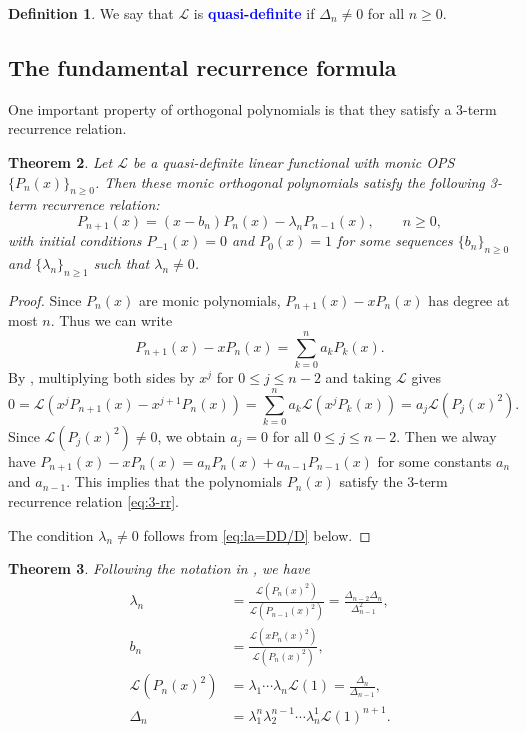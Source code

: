 \documentclass{amsart}
\numberwithin{equation}{section}
\newtheorem{thm}{Theorem}[section]
\theoremstyle{definition}
\newtheorem{defn}[thm]{Definition}
\newcommand\LL{\mathcal{L}}
\renewcommand\emph[1]{\textcolor{blue}{\bf #1}}
\begin{document}
\begin{defn}
  We say that \( \LL \) is \emph{quasi-definite} if
  \( \Delta_n\ne 0 \) for all \( n\ge0 \).
\end{defn}


\subsection{The fundamental recurrence formula}

One important property of orthogonal polynomials is that they satisfy
a 3-term recurrence relation.

\begin{thm}\label{thm:3-RR}
  Let \( \LL \) be a quasi-definite linear functional
  with monic OPS \( \{ P_n(x) \}_{n\ge 0} \).
  Then these monic orthogonal polynomials satisfy
  the following 3-term recurrence relation:
  \begin{equation}\label{eq:3-rr}
    P_{n+1}(x) = (x-b_n) P_n(x) - \lambda_n P_{n-1}(x), \qquad n\ge0,
  \end{equation}
  with initial conditions \( P_{-1}(x) = 0 \) and \( P_0(x) = 1 \) for
  some sequences \( \{b_n\}_{n\ge0} \) and \( \{\lambda_n\}_{n\ge1} \)
  such that \( \lambda_n\ne 0 \).
\end{thm}
\begin{proof}
  Since \( P_n(x) \) are monic polynomials, \( P_{n+1}(x) - xP_n(x) \)
  has degree at most \( n \). Thus we can write
  \[
    P_{n+1}(x) - xP_n(x) = \sum_{k=0}^n a_k P_k(x).
  \]
  By , multiplying both sides by \( x^j \) for \( 0\le j\le n-2 \)
  and taking \( \LL \) gives
  \[
 0 = \LL(x^j P_{n+1}(x) - x^{j+1}P_n(x))
    = \sum_{k=0}^n a_k \LL(x^j P_k(x))  = a_j \LL(P_j(x)^2).
  \]
  Since \( \LL(P_j(x)^2) \ne 0 \), we obtain \( a_j=0 \) for all
  \( 0\le j\le n-2 \). Then we alway have
  \( P_{n+1}(x) - xP_n(x) = a_nP_n(x) + a_{n-1}P_{n-1}(x) \) for some
  constants \( a_n \) and \( a_{n-1} \). This implies that the
  polynomials \( P_n(x) \) satisfy the 3-term recurrence relation
  \eqref{eq:3-rr}.

  The condition \( \lambda_n\ne 0 \) follows from \eqref{eq:la=DD/D} below.
\end{proof}

\begin{thm}
  Following the notation in , we have
  \begin{align}
    \label{eq:la=DD/D}
    \lambda_n &= \frac{\LL(P_n(x)^2)}{\LL(P_{n-1}(x)^2)} = \frac{\Delta_{n-2}\Delta_n}{\Delta_{n-1}^2}, \\
    \label{eq:b=xP/P}
    b_n &= \frac{\LL(xP_{n}(x)^2)}{\LL(P_{n}(x)^2)},\\
    \label{eq:P2=lala}
    \LL(P_n(x)^2) &= \lambda_1\cdots\lambda_{n} \LL(1) = \frac{\Delta_n}{\Delta_{n-1}}, \\
    \label{eq:D=lala}
    \Delta_n &= \lambda_1^{n}\lambda_2^{n-1}\cdots\lambda_{n}^1 \LL(1)^{n+1}.
  \end{align}
\end{thm}
\end{document}
